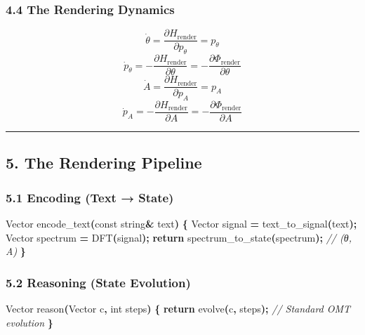\documentclass[
  11pt,
  a4paper,
]{article}
\newenvironment{Shaded}{\begin{snugshade}}{\end{snugshade}}
\newcommand{\AttributeTok}[1]{\textcolor[rgb]{0.13,0.29,0.53}{#1}}
\newcommand{\CommentTok}[1]{\textcolor[rgb]{0.56,0.35,0.01}{\textit{#1}}}
\newcommand{\ControlFlowTok}[1]{\textcolor[rgb]{0.13,0.29,0.53}{\textbf{#1}}}
\newcommand{\DataTypeTok}[1]{\textcolor[rgb]{0.13,0.29,0.53}{#1}}
\newcommand{\NormalTok}[1]{#1}
\newcommand{\OperatorTok}[1]{\textcolor[rgb]{0.81,0.36,0.00}{\textbf{#1}}}
\begin{document}
\subsubsection{4.4 The Rendering Dynamics}\label{the-rendering-dynamics}

\[
\dot{\theta} = \frac{\partial H_{\text{render}}}{\partial p_\theta} = p_\theta
\] \[
\dot{p}_\theta = -\frac{\partial H_{\text{render}}}{\partial \theta} = -\frac{\partial \Phi_{\text{render}}}{\partial \theta}
\] \[
\dot{A} = \frac{\partial H_{\text{render}}}{\partial p_A} = p_A
\] \[
\dot{p}_A = -\frac{\partial H_{\text{render}}}{\partial A} = -\frac{\partial \Phi_{\text{render}}}{\partial A}
\]

\begin{center}\rule{0.5\linewidth}{0.5pt}\end{center}

\subsection{5. The Rendering Pipeline}\label{the-rendering-pipeline}

\subsubsection{5.1 Encoding (Text → State)}\label{encoding-text-state}

\begin{Shaded}
\begin{Highlighting}[]
\NormalTok{Vector encode\_text}\OperatorTok{(}\AttributeTok{const}\NormalTok{ string}\OperatorTok{\&}\NormalTok{ text}\OperatorTok{)} \OperatorTok{\{}
\NormalTok{    Vector signal }\OperatorTok{=}\NormalTok{ text\_to\_signal}\OperatorTok{(}\NormalTok{text}\OperatorTok{);}
\NormalTok{    Vector spectrum }\OperatorTok{=}\NormalTok{ DFT}\OperatorTok{(}\NormalTok{signal}\OperatorTok{);}
    \ControlFlowTok{return}\NormalTok{ spectrum\_to\_state}\OperatorTok{(}\NormalTok{spectrum}\OperatorTok{);}  \CommentTok{// (θ, A)}
\OperatorTok{\}}
\end{Highlighting}
\end{Shaded}

\subsubsection{5.2 Reasoning (State
Evolution)}\label{reasoning-state-evolution}

\begin{Shaded}
\begin{Highlighting}[]
\NormalTok{Vector reason}\OperatorTok{(}\NormalTok{Vector c}\OperatorTok{,} \DataTypeTok{int}\NormalTok{ steps}\OperatorTok{)} \OperatorTok{\{}
    \ControlFlowTok{return}\NormalTok{ evolve}\OperatorTok{(}\NormalTok{c}\OperatorTok{,}\NormalTok{ steps}\OperatorTok{);}  \CommentTok{// Standard OMT evolution}
\OperatorTok{\}}
\end{Highlighting}
\end{Shaded}
\end{document}
